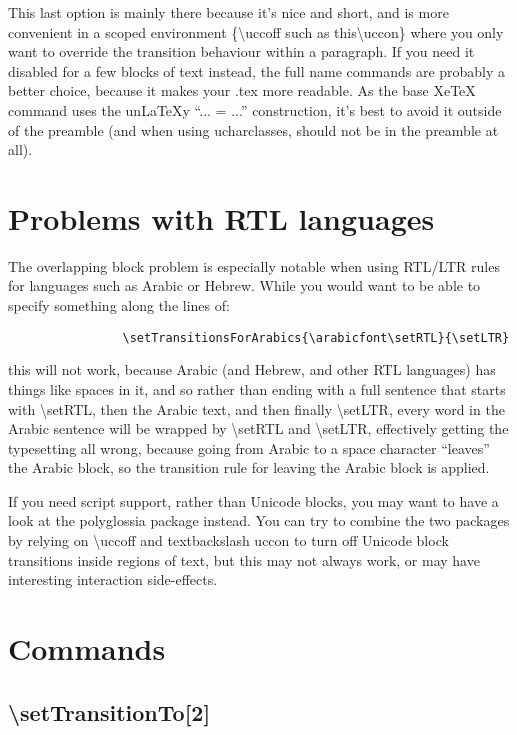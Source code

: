 \documentclass{article}
\begin{document}
			This last option is mainly there because it's nice and short, and is more convenient in a scoped environment \{\textbackslash uccoff such as this\textbackslash uccon\} where you only want to override the transition behaviour within a paragraph. If you need it disabled for a few blocks of text instead, the full name commands are probably a better choice, because it makes your .tex more readable. As the base XeTeX command uses the un\LaTeX y “... = ...” construction, it's best to avoid it outside of the preamble (and when using ucharclasses, should not be in the preamble at all).

	\section{Problems with RTL languages}

		The overlapping block problem is especially notable when using RTL/LTR rules for languages such as Arabic or Hebrew. While you would want to be able to specify something along the lines of:

		\begin{verbatim}
				\setTransitionsForArabics{\arabicfont\setRTL}{\setLTR}
		\end{verbatim}

		this will not work, because Arabic (and Hebrew, and other RTL languages) has things like spaces in it, and so rather than ending with a full sentence that starts with \textbackslash setRTL, then the Arabic text, and then finally \textbackslash setLTR, every word in the Arabic sentence will be wrapped by \textbackslash setRTL and \textbackslash setLTR, effectively getting the typesetting all wrong, because going from Arabic to a space character “leaves” the Arabic block, so the transition rule for leaving the Arabic block is applied.

		If you need script support, rather than Unicode blocks, you may want to have a look at the polyglossia package instead. You can try to combine the two packages by relying on \textbackslash uccoff and textbackslash uccon to turn off Unicode block transitions inside regions of text, but this may not always work, or may have interesting interaction side-effects.

	\pagebreak
	\section{Commands}

		\subsection{\textbackslash setTransitionTo[2]}
\end{document}
